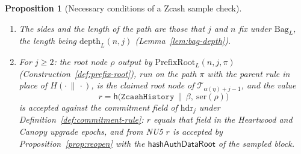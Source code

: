 \documentclass[11pt,a4paper]{article}
\newtheorem{proposition}[theorem]{Proposition}
\theoremstyle{definition}
\begin{document}
\begin{proposition}[Necessary conditions of a Zcash sample check]
\begin{enumerate}[label=(\roman*)]
  directly in the Heartwood and Canopy upgrade epochs, and from NU5 through
  Proposition~\ref{prop:reopen} with the head's $\mathsf{hashAuthDataRoot}$.
\item The sides and the length of the path are those that $j$ and $n$ fix
  under $\mathrm{Bag}_L$, the length being $\mathrm{depth}_L(n, j)$
  (Lemma~\ref{lem:bag-depth}).
\item For $j \ge 2$: the root node $\rho$ output by
  $\mathrm{PrefixRoot}_L(n, j, \pi)$ (Construction~\ref{def:prefix-root}),
  run on the path $\pi$ with the parent rule in place of
  $H(\cdot \,\|\, \cdot)$, is the claimed root node of
  $\mathcal{T}_{\alpha(\eta)+j-1}$, and the value
  \[
    r = \mathsf{h}\bigl(\texttt{ZcashHistory} \,\|\, \beta,\
      \mathrm{ser}(\rho)\bigr)
  \]
  is accepted against the commitment field of $\mathrm{hdr}_j$ under
  Definition~\ref{def:commitment-rule}: $r$ equals that field in the
  Heartwood and Canopy upgrade epochs, and from NU5 $r$ is accepted by
  Proposition~\ref{prop:reopen} with the $\mathsf{hashAuthDataRoot}$ of the
  sampled block.
\end{enumerate}
\end{proposition}
\end{document}
